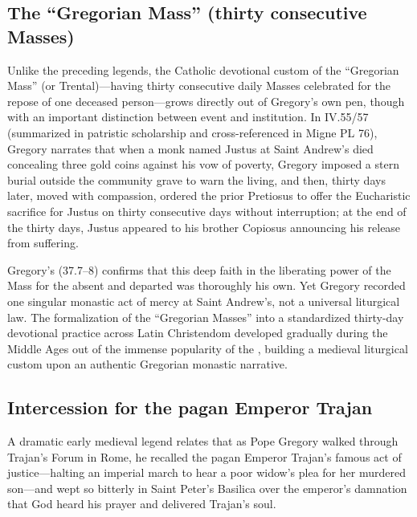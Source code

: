 \subsection{The ``Gregorian Mass'' (thirty consecutive Masses)}

Unlike the preceding legends, the Catholic devotional custom of the
``Gregorian Mass'' (or Trental)---having thirty consecutive daily Masses
celebrated for the repose of one deceased person---grows directly out of
Gregory's own pen, though with an important distinction between event and
institution. In  IV.55/57 (summarized in patristic scholarship
and cross-referenced in Migne PL 76), Gregory narrates that when a monk
named Justus at Saint Andrew's died concealing three gold coins against his
vow of poverty, Gregory imposed a stern burial outside the community grave to
warn the living, and then, thirty days later, moved with compassion, ordered
the prior Pretiosus to offer the Eucharistic sacrifice for Justus on thirty
consecutive days without interruption; at the end of the thirty days, Justus
appeared to his brother Copiosus announcing his release from suffering.

Gregory's  (37.7--8) confirms that this
deep faith in the liberating power of the Mass for the absent and departed was
thoroughly his own. Yet Gregory recorded one singular monastic act of mercy at
Saint Andrew's, not a universal liturgical law. The formalization of the
``Gregorian Masses'' into a standardized thirty-day devotional practice across
Latin Christendom developed gradually during the Middle Ages out of the
immense popularity of the , building a medieval liturgical custom
upon an authentic Gregorian monastic narrative.

\subsection{Intercession for the pagan Emperor Trajan}

A dramatic early medieval legend relates that as Pope Gregory walked through
Trajan's Forum in Rome, he recalled the pagan Emperor Trajan's famous act of
justice---halting an imperial march to hear a poor widow's plea for her
murdered son---and wept so bitterly in Saint Peter's Basilica over the
emperor's damnation that God heard his prayer and delivered Trajan's soul.

